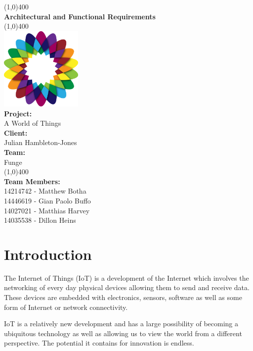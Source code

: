 \documentclass{article}
\begin{document}
\begin{titlepage}
	\begin{center}
		\line(1,0){400}\\
		[6mm]
		\huge{\bfseries Architectural and Functional Requirements}\\
		\line(1,0){400}\\
			[5mm]
			\includegraphics[width=150px]{images/AWorldOfPlants.png}
			\\
		[5mm]
		\large\textbf{Project:}\\A World of Things\\
		[3mm]
		\large\textbf{Client:}\\Julian Hambleton-Jones\\
		[3mm]
		\large \textbf{Team:}\\Funge\\
		\line(1,0){400}\\
		[5mm]
		\large \textbf{Team Members:}\\
		[3mm]
		\large 14214742 - Matthew Botha\\
		\large 14446619 - Gian Paolo Buffo\\
		\large 14027021 - Matthias Harvey\\
        \large 14035538 - Dillon Heins\\[3mm]
	\end{center}
\end{titlepage}

\cleardoublepage
\thispagestyle{empty}
\tableofcontents
\cleardoublepage
\setcounter{page}{1}

\section{Introduction}
	The Internet of Things (IoT) is a development of the Internet which involves the networking of every day physical devices allowing them to send and receive data. These devices are embedded with electronics, sensors, software as well as some form of Internet or network connectivity.

	IoT is a relatively new development and has a large possibility of becoming a ubiquitous technology as well as allowing us to view the world from a different perspective. The potential it contains for innovation is endless.
\end{document}
